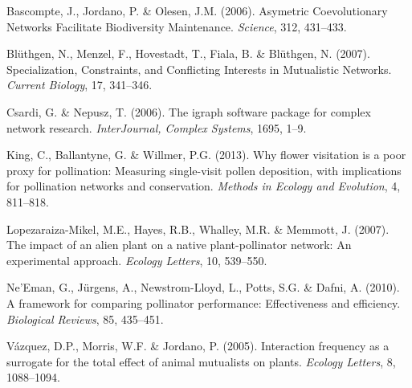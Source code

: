\documentclass[a4paper]{artikel1}
\begin{document}
\hypertarget{ref-Bascompte2006}{}
Bascompte, J., Jordano, P. \& Olesen, J.M. (2006). Asymetric
Coevolutionary Networks Facilitate Biodiversity Maintenance.
\emph{Science}, 312, 431--433.

\hypertarget{ref-Bluthgen2007}{}
Blüthgen, N., Menzel, F., Hovestadt, T., Fiala, B. \& Blüthgen, N.
(2007). Specialization, Constraints, and Conflicting Interests in
Mutualistic Networks. \emph{Current Biology}, 17, 341--346.

\hypertarget{ref-Csardi2006a}{}
Csardi, G. \& Nepusz, T. (2006). The igraph software package for complex
network research. \emph{InterJournal, Complex Systems}, 1695, 1--9.

\hypertarget{ref-King2013}{}
King, C., Ballantyne, G. \& Willmer, P.G. (2013). Why flower visitation
is a poor proxy for pollination: Measuring single-visit pollen
deposition, with implications for pollination networks and conservation.
\emph{Methods in Ecology and Evolution}, 4, 811--818.

\hypertarget{ref-Lopezaraiza-Mikel2007}{}
Lopezaraiza-Mikel, M.E., Hayes, R.B., Whalley, M.R. \& Memmott, J.
(2007). The impact of an alien plant on a native plant-pollinator
network: An experimental approach. \emph{Ecology Letters}, 10, 539--550.

\hypertarget{ref-NeEman2010}{}
Ne'Eman, G., Jürgens, A., Newstrom-Lloyd, L., Potts, S.G. \& Dafni, A.
(2010). A framework for comparing pollinator performance: Effectiveness
and efficiency. \emph{Biological Reviews}, 85, 435--451.

\hypertarget{ref-Vazquez2005}{}
Vázquez, D.P., Morris, W.F. \& Jordano, P. (2005). Interaction frequency
as a surrogate for the total effect of animal mutualists on plants.
\emph{Ecology Letters}, 8, 1088--1094.
\end{document}
